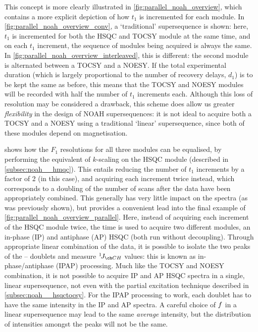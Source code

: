 This concept is more clearly illustrated in \cref{fig:parallel_noah_overview}, which contains a more explicit depiction of how $t_1$ is incremented for each module.
In \cref{fig:parallel_noah_overview_conv}, a `traditional'  supersequence is shown: here, $t_1$ is incremented for both the HSQC and TOCSY module at the same time, and on each $t_1$ increment, the sequence of modules being acquired is always the same.
In \cref{fig:parallel_noah_overview_interleaved}, this is different: the second module is alternated between a TOCSY and a NOESY.
If the total experimental duration (which is largely proportional to the number of recovery delays, $d_1$) is to be kept the same as before, this means that the TOCSY and NOESY modules will be recorded with half the number of $t_1$ increments each.
Although this loss of resolution may be considered a drawback, this scheme does allow us greater \textit{flexibility} in the design of NOAH supersequences: it is not ideal to acquire both a TOCSY and a NOESY using a traditional `linear' supersequence, since both of these modules depend on  magnetisation.

 shows how the $F_1$ resolutions for all three modules can be equalised, by performing the equivalent of $k$-scaling on the HSQC module (described in \cref{subsec:noah__hmqc}).
This entails reducing the number of $t_1$ increments by a factor of 2 (in this case), and acquiring each increment twice instead, which corresponds to a doubling of the number of scans after the data have been appropriately combined.
This generally has very little impact on the spectra (as was previously shown), but provides a convenient lead into the final example of \cref{fig:parallel_noah_overview_parallel}.
Here, instead of acquiring each increment of the HSQC module twice, the time is used to acquire two different modules, an in-phase (IP) and antiphase (AP) HSQC (both run without \carbon{} decoupling).
Through appropriate linear combination of the data, it is possible to isolate the two peaks of the \proton{}--\carbon{} doublets and measure $\oneJ{CH}$ values: this is known as in-phase/antiphase (IPAP) processing.\autocite{Ottiger1998JMR,Nolis2006JMR,Enthart2008JMR,Gil2010JMR}
Much like the TOCSY and NOESY combination, it is not possible to acquire IP and AP HSQC spectra in a single, linear supersequence, not even with the partial  excitation technique described in \cref{subsec:noah__hsqctocsy}.
For the IPAP processing to work, each doublet has to have the same intensity in the IP and AP spectra.
A careful choice of $f\/$ in a linear supersequence may lead to the same \textit{average} intensity, but the distribution of intensities amongst the peaks will not be the same.

